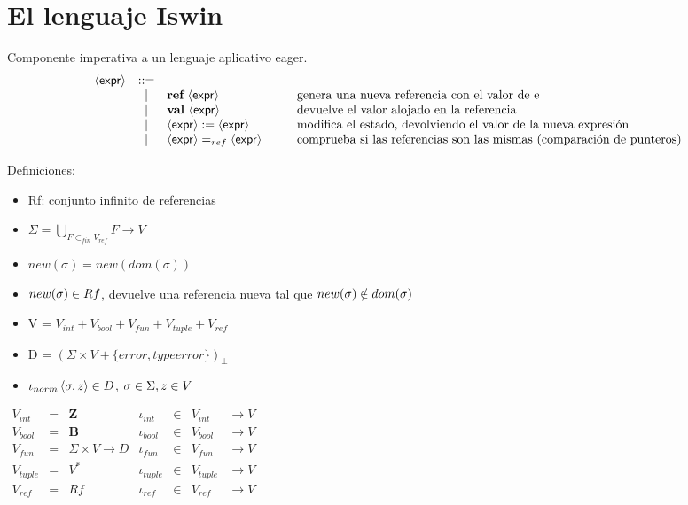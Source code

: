 \section{El lenguaje Iswin}
  \PN Componente imperativa a un lenguaje aplicativo eager.
  \[\begin{array}{rcl@{\hspace{1cm}}l}
    \expr &::=&  \\
      &|& \textbf{ref} \ \expr & \text{genera una nueva referencia con el valor de e} \\
      &|& \textbf{val} \ \expr & \text{devuelve el valor alojado en la referencia} \\
      &|& \expr := \expr & \text{modifica el estado, devolviendo el valor de la nueva expresión} \\
      &|& \expr =_{ref} \expr & \text{comprueba si las referencias son las mismas (comparación de punteros)}
  \end{array}\]

  \PN Definiciones:
  \begin{itemize}
    \item Rf: conjunto infinito de referencias
    \item $\Sigma = \bigcup\limits_{F \subset_{fin} V_{ref}} F \to V$
    \item $new(\sigma) = new(dom(\sigma))$
    \item $new(\sigma) \in Rf$, devuelve una referencia nueva tal que $new(\sigma) \notin dom(\sigma)$
    \item V = $V_{int} + V_{bool} + V_{fun} + V_{tuple} + V_{ref}$
    \item D = $(\Sigma \times V + \{error, typeerror\})_{\bot}$
    \item $\iota_{norm} \left\langle \sigma, z \right\rangle \in D$, $\sigma \in \Sigma, z \in V$
  \end{itemize}

  \vspace{3mm}
  $\begin{array}{lllllll}
    V_{int} &=& \mathbf{Z} & \iota_{int} &\in& V_{int} & \rightarrow V \\
    V_{bool} &=& \mathbf{B} & \iota_{bool} &\in& V_{bool} & \rightarrow V \\
    V_{fun} &=& \Sigma \times V \rightarrow D & \iota_{fun} &\in& V_{fun} & \rightarrow V \\
    V_{tuple} &=& V^{\ast} & \iota_{tuple} &\in& V_{tuple} & \rightarrow V \\
    V_{ref} &=& Rf & \iota_{ref} &\in& V_{ref} & \rightarrow V
  \end{array}$

